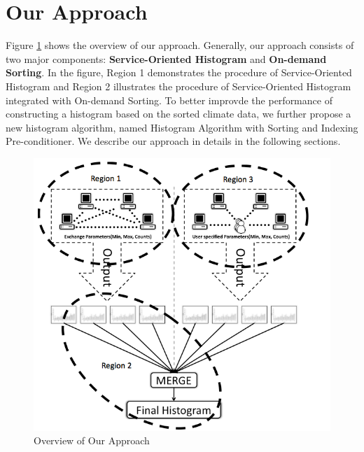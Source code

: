 \documentclass[times, 10pt,onecolumn]{article} %
\begin{document}
\section{Our Approach}
Figure \ref{fig:overview} shows the overview of our approach. Generally, our approach consists of two major components: \textbf{Service-Oriented Histogram} and \textbf{On-demand Sorting}. In the figure, Region 1 demonstrates the procedure of Service-Oriented Histogram and Region 2 illustrates the procedure of Service-Oriented Histogram integrated with On-demand Sorting. To better improvde the performance of constructing a histogram based on the sorted climate data, we further propose a new histogram algorithm, named Histogram Algorithm with Sorting and Indexing Pre-conditioner. We describe our approach in details in the following sections.

\begin{figure}[!iht]
\begin{center}
  \includegraphics[scale=0.65]{architecture.png}
  \caption{Overview of Our Approach}
  \label{fig:overview}
\end{center}
\end{figure}
\end{document}
